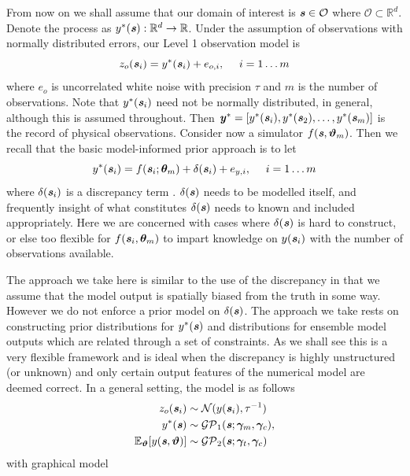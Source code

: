 \documentclass[10pt,a4paper]{article}
\newcommand{\expect} {{\mathbb{E}}}
\newcommand{\thetab} {{\boldsymbol{\theta}}}
\newcommand{\varthetab} {{\boldsymbol{\vartheta}}}
\newcommand{\gammab} {\boldsymbol{\gamma}}
\newcommand{\yvec} {\textbf{\textit{y}}}
\newcommand{\svec} {\textbf{\textit{s}}}
\begin{document}
From now on we shall assume that our domain of interest is $\svec \in \mathcal{O}$ where $\mathcal{O} \subset \mathbb{R}^d$. Denote the process as  $y^*(\svec): \mathbb{R}^d \rightarrow \mathbb{R}$. Under the assumption of observations with normally distributed errors, our Level 1 observation model is 
\begin{equation}
z_o(\svec_i) = y^*(\svec_i) + e_{o,i}, ~~~~ i = 1\dots m
\end{equation}
\noindent where $e_o$ is uncorrelated white noise with precision $\tau$ and $m$ is the number of observations. Note that $y^*(\svec_i)$ need not be normally distributed, in general, although this is assumed throughout. Then $\yvec^* = [y^*(\svec_i), y^*(\svec_2), \dots, y^*(\svec_m)]$ is the record of physical observations. Consider now a simulator $f(\svec,\varthetab_m)$. Then we recall that the basic model-informed prior approach is to let
\begin{equation}
y^*(\svec_i) = f(\svec_i;\thetab_m) + \delta(\svec_i) + e_{y,i}, ~~~~ i = 1\dots m
\end{equation}
\noindent where $\delta(\svec_i)$ is a discrepancy term \citep[e.g.][]{Kennedy_2001}. $\delta(\svec)$ needs to be modelled itself, and frequently insight of what constitutes $\delta(\svec)$ needs to known and included appropriately. Here we are concerned with cases where  $\delta(\svec)$ is hard to construct, or else too flexible for $f(\svec_i,\thetab_m)$ to impart knowledge on $ y(\svec_i)$ with the number of observations available. 

The approach we take here is similar to the use of the discrepancy in that we assume that the model output is spatially biased from the truth in some way. However we do not enforce a prior model on $\delta(\svec)$. The approach we take rests on constructing prior distributions for $y^*(\svec)$ and distributions for ensemble model outputs which are related through a set of constraints. As we shall see this is a very flexible framework and is ideal when the discrepancy is highly unstructured (or unknown) and only certain output features of the numerical model are deemed correct. In a general setting, the model is as follows
\begin{align}
z_o(\svec_i) &\sim \mathcal{N}( y(\svec_i),\tau^{-1}) \\
y^*(\svec) &\sim \mathcal{GP}_1(\svec;\gammab_m,\gammab_c), \\
\expect_\varthetab[y(\svec,\varthetab)] &\sim \mathcal{GP}_2(\svec;\gammab_t,\gammab_c) 
\end{align}
\noindent with graphical model
\end{document}
